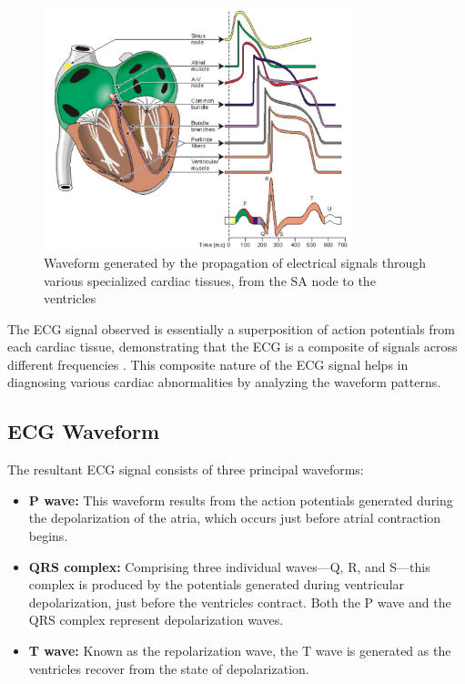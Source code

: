 \begin{figure}[h]
	\centering
	\includegraphics[width=0.8\textwidth]{images/action potention propagation of the heart}
	\caption{Waveform generated by the propagation of electrical signals through various specialized cardiac tissues, from the SA node to the ventricles~\cite{malminen1995}}
	\label{fig:ecg_signal}
\end{figure}

\noindent The ECG signal observed is essentially a superposition of action potentials from each cardiac tissue, demonstrating that the ECG is a composite of signals across different frequencies \cite{malminen1995}. This composite nature of the ECG signal helps in diagnosing various cardiac abnormalities by analyzing the waveform patterns.\\

\subsection{ECG Waveform}
\vspace{1em}
\noindent The resultant ECG signal consists of three principal waveforms:

\begin{itemize}
	\item \textbf{P wave:} This waveform results from the action potentials generated during the depolarization of the atria, which occurs just before atrial contraction begins.
	\item \textbf{QRS complex:} Comprising three individual waves—Q, R, and S—this complex is produced by the potentials generated during ventricular depolarization, just before the ventricles contract. Both the P wave and the QRS complex represent depolarization waves.
	\item \textbf{T wave:} Known as the repolarization wave, the T wave is generated as the ventricles recover from the state of depolarization.
\end{itemize}

